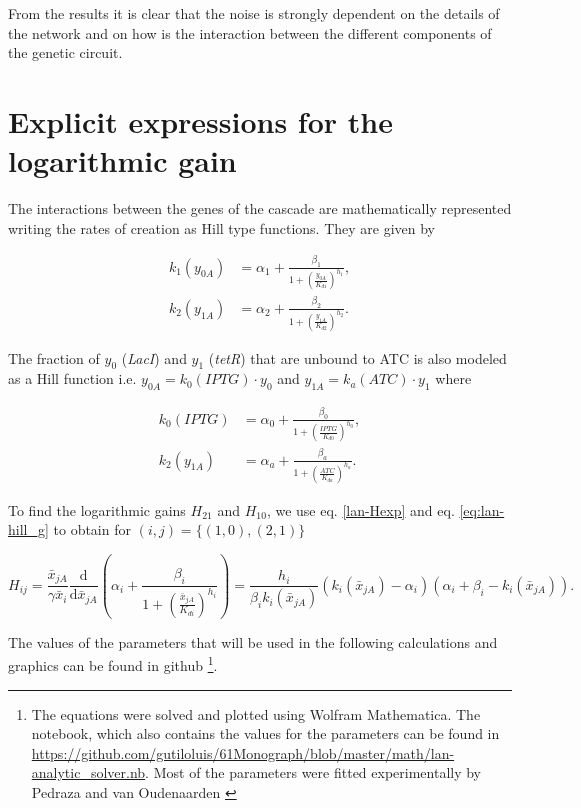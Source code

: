 From the results it is clear that the noise is strongly dependent on the details of the network and on how is the interaction between the different components of the genetic circuit.

\section{Explicit expressions for the logarithmic gain}

The interactions between the genes of the cascade are mathematically represented writing the rates of creation as Hill type functions. They are given by

\begin{equation}
  \label{eq:lan-hill_g}
  \begin{split}
    k_1(y_{0A}) &= \alpha_1 + \frac{\beta_1}{1+(\frac{y_{0A}}{K_{d1}})^{h_1}},\\
    k_2(y_{1A}) &= \alpha_2 + \frac{\beta_2}{1+(\frac{y_{1A}}{K_{d2}})^{h_2}}.
\end{split}
  \end{equation}

The fraction of $y_0$ (\textit{LacI}) and $y_1$ (\textit{tetR}) that are unbound to ATC is also modeled as a Hill function i.e. $y_{0A} = k_0(IPTG)\cdot y_0$ and $y_{1A} = k_a(ATC)\cdot y_1$ where

\begin{equation}
  \begin{split}
    k_0(IPTG) &= \alpha_0 + \frac{\beta_0}{1+(\frac{IPTG}{K_{d0}})^{h_0}},\\
    k_2(y_{1A}) &= \alpha_a + \frac{\beta_a}{1+(\frac{ATC}{K_{da}})^{h_a}}.
\end{split}
  \end{equation}

To find the logarithmic gains $H_{21}$ and $H_{10}$, we use eq. \eqref{lan-Hexp} and eq. \eqref{eq:lan-hill_g} to obtain for $(i,j) = \{(1,0),(2,1)\}$

\begin{equation}
  \label{eq:lan-H_det}
  H_{ij} = \frac{\bar{x}_{jA}}{\gamma\bar{x}_i}\frac{\mathrm{d}}{\mathrm{d} \bar{x}_{jA}}\left( \alpha_i + \frac{\beta_i}{1+(\frac{\bar{x}_{jA}}{K_{di}})^{h_i}}\right) = \frac{h_i}{\beta_i k_i(\bar{x}_{jA})}\left(k_i(\bar{x}_{jA}) - \alpha_i\right) \left(\alpha_i+\beta_i-k_i(\bar{x}_{jA})\right).
\end{equation}

The values of the parameters that will be used in the following calculations and graphics can be found in github \footnote{The equations were solved and plotted using Wolfram Mathematica. The notebook, which also contains the values for the parameters can be found in \url{https://github.com/gutiloluis/61Monograph/blob/master/math/lan-analytic_solver.nb}. Most of the parameters were fitted experimentally by Pedraza and van Oudenaarden \cite{pedraza05}}. 

